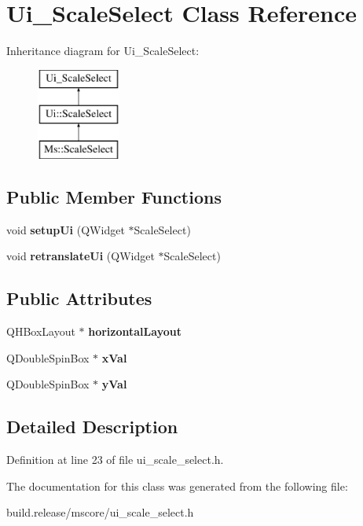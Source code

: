 \hypertarget{class_ui___scale_select}{}\section{Ui\+\_\+\+Scale\+Select Class Reference}
\label{class_ui___scale_select}
Inheritance diagram for Ui\+\_\+\+Scale\+Select\+:\begin{figure}[H]
\begin{center}
\leavevmode
\includegraphics[height=3.000000cm]{class_ui___scale_select}
\end{center}
\end{figure}
\subsection*{Public Member Functions}
\begin{DoxyCompactItemize}
\item 
\mbox{\label{class_ui___scale_select_ac6a570bd72a86f12a6adc849c943ce55}} 
void {\bfseries setup\+Ui} (Q\+Widget $\ast$Scale\+Select)
\item 
\mbox{\label{class_ui___scale_select_ad940a9b9dc835bd547badd4c21fe0a4c}} 
void {\bfseries retranslate\+Ui} (Q\+Widget $\ast$Scale\+Select)
\end{DoxyCompactItemize}
\subsection*{Public Attributes}
\begin{DoxyCompactItemize}
\item 
\mbox{\label{class_ui___scale_select_a7900f576e4e5e0e51bc568e1dcea913f}} 
Q\+H\+Box\+Layout $\ast$ {\bfseries horizontal\+Layout}
\item 
\mbox{\label{class_ui___scale_select_a0ab305df07916c71eb67dcec42305691}} 
Q\+Double\+Spin\+Box $\ast$ {\bfseries x\+Val}
\item 
\mbox{\label{class_ui___scale_select_a8003cc40601c97aad72885da275fb81c}} 
Q\+Double\+Spin\+Box $\ast$ {\bfseries y\+Val}
\end{DoxyCompactItemize}


\subsection{Detailed Description}


Definition at line 23 of file ui\+\_\+scale\+\_\+select.\+h.



The documentation for this class was generated from the following file\+:\begin{DoxyCompactItemize}
\item 
build.\+release/mscore/ui\+\_\+scale\+\_\+select.\+h\end{DoxyCompactItemize}
